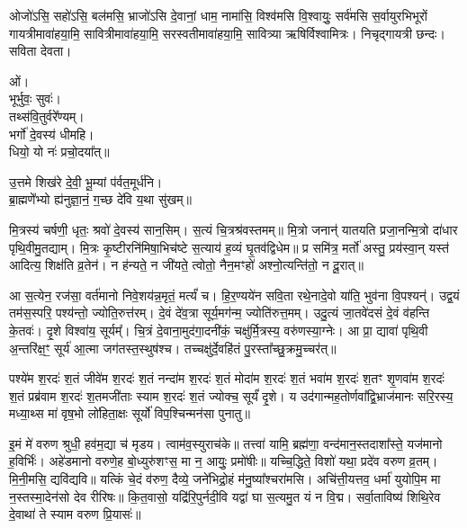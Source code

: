 ओजो॑ऽसि॒ सहो॑ऽसि॒ बल॑मसि॒ भ्राजो॑ऽसि दे॒वानां॒ धाम॒ नामा॑सि॒ विश्व॑मसि वि॒श्वायुः॒ सर्व॑मसि स॒र्वायुरभिभूरों गायत्रीमावा॑हया॒मि॒ सावित्रीमावा॑हया॒मि॒ सरस्वतीमावा॑ह\-या॒मि॒ सावित्र्या ऋषिर्विश्वामित्रः। निचृद्गायत्री छन्दः। सविता देवता।


ओं।\\
भूर्भुवः॒ सुवः॑।\\
तथ्स॑वि॒तुर्वरे᳚ण्यम्।\\
भर्गो॑ दे॒वस्य॑ धीमहि।\\
धियो॒ यो नः॑ प्रचो॒दया᳚त्॥


उ॒त्तमे शिख॑रे दे॒वी॒ भू॒म्यां प॑र्वत॒मूर्ध॑नि।\\
ब्रा॒ह्मणे॑॑भ्यो ह्य॑नुज्ञा॒नं॒ ग॒च्छ दे॑वि य॒था सु॑खम्॥


मि॒त्रस्य॑ चर्\mbox{}षणी॒ धृतः॒ श्रवो॑ दे॒वस्य॑ सान॒सिम्। स॒त्यं चि॒त्रश्र॑वस्तमम्॥ मि॒त्रो जनान्॑ यातयति प्रजा॒नन्मि॒त्रो दा॑धार पृथि॒वीमु॒तद्याम्। मि॒त्रः कृ॒ष्टीरनि॑मिषा॒भिच॑ष्टे स॒त्याय॑ ह॒व्यं घृ॒तव॑द्विधेम॥ प्र समि॑त्र॒ मर्तो॑ अस्तु॒ प्रय॑स्वा॒न् यस्त॑ आदित्य॒ शिक्ष॑ति व्र॒तेन॑। न ह॑न्यते॒ न जी॑यते॒ त्वोतो॒ नैन॒मꣳहो॑ अश्नो॒त्यन्ति॑तो॒ न दू॒रात्॥


आ स॒त्येन॒ रज॑सा॒ वर्त॑मानो निवे॒शय॑न्न॒मृतं॒ मर्त्यं॑ च। हि॒र॒ण्यये॑न सवि॒ता रथे॒नादे॒वो या॑ति॒ भुव॑ना वि॒पश्यन्॑। उद्व॒यं तम॑स॒स्परि॒ पश्य॑न्तो॒ ज्योति॒रुत्त॑रम्। दे॒वं दे॑व॒त्रा सूर्य॒मग॑न्म॒ ज्योति॑रुत्त॒मम्। उदु॒त्यं जा॒तवे॑दसं दे॒वं व॑हन्ति के॒तवः॑। दृ॒शे विश्वा॑य॒ सूर्यम्᳚। चि॒त्रं दे॒वाना॒मुद॑गा॒दनी॑कं॒ चक्षु॑र्मि॒त्रस्य॒ वरु॑णस्या॒ग्नेः। आ प्रा॒ द्यावा॑ पृथि॒वी अ॒न्तरि॑क्ष॒ꣳ॒ सूर्य॑ आ॒त्मा जग॑तस्त॒स्थुष॑श्च। तच्चक्षु॑र्दे॒वहि॑तं पु॒रस्ता᳚च्छु॒क्रमु॒च्चर॑त्॥

पश्ये॑म श॒रदः॑ श॒तं जीवे॑म श॒रदः॑ श॒तं नन्दा॑म श॒रदः॑ श॒तं मोदा॑म श॒रदः॑ श॒तं भवा॑म श॒रदः॑ श॒तꣳ शृ॒णवा॑म श॒रदः॑ श॒तं प्रब्र॑वाम श॒रदः॑ श॒तमजी॑ताः स्याम श॒रदः॑ श॒तं ज्योक्च॒ सूर्यं॑ दृ॒शे। य उद॑गान्मह॒तोर्णवा᳚द्वि॒भ्राज॑मानः सरि॒रस्य॒ मध्या॒थ्स मा॑ वृष॒भो लो॑हिता॒क्षः सूर्यो॑ विप॒श्चिन्मन॑सा पुनातु॥

इ॒मं मे॑ वरुण श्रुधी॒ हव॑म॒द्या च॑ मृडय। त्वाम॑व॒स्युराच॑के॥ तत्त्वा॑ यामि॒ ब्रह्म॑णा॒ वन्द॑मान॒स्तदाशा᳚स्ते॒ यज॑मानो ह॒विर्भिः॑। अहे॑डमानो वरुणे॒ह बो॒ध्युरु॑शꣳस॒ मा न॒ आयुः॒ प्रमो॑षीः॥
यच्चि॒द्धिते॒ विशो॑ यथा॒ प्रदे॑व वरुण व्र॒तम्। मि॒नी॒मसि॒ द्यवि॑द्यवि॥ यत्किं चे॒दं व॑रुण॒ दैव्ये॒ जने॑भिद्रो॒हं म॑नु॒ष्या᳚श्चरा॑मसि। अचि॑त्ती॒यत्तव॒ धर्मा॑ युयोपि॒म मा न॒स्तस्मा॒देन॑सो देव रीरिषः॥ कि॒त॒वासो॒ यद्रि॑रि॒पुर्नदी॒वि यद्वा॑ घा स॒त्यमु॒त यं न वि॒द्म। सर्वा॒ताविष्य॑ शिथि॒रेव दे॒वाथा॑ ते स्याम वरुण प्रि॒यासः॑॥


